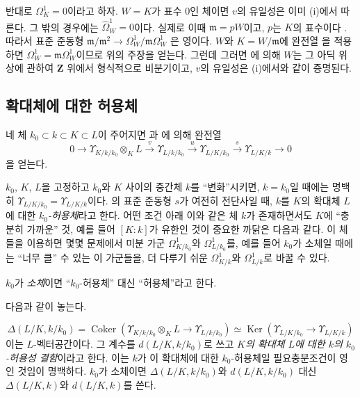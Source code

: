 \begin{remarks}[21.5.3]
\begin{enumerate}
  반대로 $\Omega^1_K=0$이라고 하자. $W=K$가 표수 $0$인 체이면
  $v$의 유일성은 이미 (i)에서 따른다. 그 밖의 경우에는
  $\widehat{\Omega}^1_W=0$이다. 실제로 이때
  $\mathfrak m=pW$이고, $p$는 $K$의 표수이다
  . 따라서 표준 준동형
  $\mathfrak m/\mathfrak m^2\to
  \Omega^1_W/\mathfrak m\Omega^1_W$
  은 영이다. $W$와
  $K=W/\mathfrak m$에 완전열 을 적용하면
  $\Omega^1_W=\mathfrak m\Omega^1_W$이므로 위의 주장을 얻는다.
  그런데 그러면 에 의해 $W$는 그 아딕 위상에
  관하여 $\mathbf Z$ 위에서 형식적으로 비분기이고, $v$의 유일성은
  (i)에서와 같이 증명된다.
\end{enumerate}
\end{remarks}

\subsection{확대체에 대한 허용체}
\label{section:0.21.6-ko}

\begin{env}[21.6.1]
\label{0.21.6.1-ko}
네 체 $k_0\subset k\subset K\subset L$이 주어지면
과 에 의해 완전열
\begin{equation}
\tag{21.6.1.1}
\label{0.21.6.1.1-ko}
0\to\Upsilon_{K/k/k_0}\otimes_KL\xrightarrow{v}\Upsilon_{L/k/k_0}
\xrightarrow{u}\Upsilon_{L/K/k_0}\xrightarrow{s}\Upsilon_{L/K/k}\to0
\end{equation}
을 얻는다.

$k_0$, $K$, $L$을 고정하고 $k_0$와 $K$ 사이의 중간체 $k$를
``변화''시키면, $k=k_0$일 때에는 명백히
$\Upsilon_{L/K/k_0}=\Upsilon_{L/K/k}$이다. 의
표준 준동형 $s$가 여전히 전단사일 때, $k$를 $K$의 확대체 $L$에
대한 \emph{$k_0$-허용체}라고 한다. 어떤 조건 아래 이와 같은 체 $k$가
존재하면서도 $K$에 ``충분히 가까운'' 것, 예를 들어 $[K:k]$가 유한인
것이 중요한 까닭은 다음과 같다. 이 체들을 이용하면 몇몇 문제에서
미분 가군 $\Omega^1_{K/k_0}$와 $\Omega^1_{L/k_0}$를, 예를 들어
$k_0$가 소체일 때에는 ``너무 클'' 수 있는 이 가군들을, 더 다루기 쉬운
$\Omega^1_{K/k}$와 $\Omega^1_{L/k}$로 바꿀 수 있다.

$k_0$가 \emph{소체}이면 ``$k_0$-허용체'' 대신 ``허용체''라고 한다.

다음과 같이 놓는다.
\end{env}

\begin{env}[21.6.1.2]
\label{0.21.6.1.2-ko}
\[
\Delta(L/K,k/k_0)=\operatorname{Coker}
(\Upsilon_{K/k/k_0}\otimes_KL\to\Upsilon_{L/k/k_0})
\simeq\operatorname{Ker}(\Upsilon_{L/K/k_0}\to\Upsilon_{L/K/k})
\]
이는 $L$-벡터공간이다. 그 계수를 $d(L/K,k/k_0)$로 쓰고
\emph{$K$의 확대체 $L$에 대한 $k$의 $k_0$-허용성 결함}이라고 한다.
이는 $k$가 이 확대체에 대한 $k_0$-허용체일 필요충분조건이 영인
것임이 명백하다. $k_0$가 소체이면 $\Delta(L/K,k/k_0)$와
$d(L/K,k/k_0)$ 대신 $\Delta(L/K,k)$와 $d(L/K,k)$를 쓴다.
\end{env}

